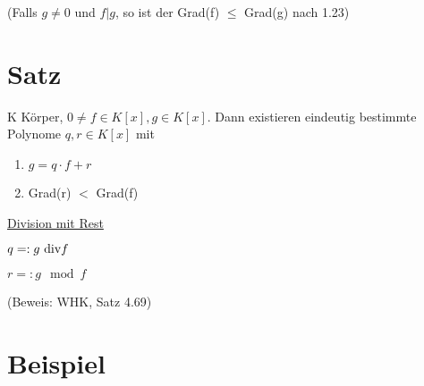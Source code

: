 \documentclass[a4paper, openany]{book}
\begin{document}
    (Falls $g \neq 0$ und $f|g$, so ist der Grad(f) $\le$ Grad(g) nach 1.23)

    \section{Satz}

    K Körper, $0 \neq f \in K[x], g \in K[x]$. Dann existieren eindeutig bestimmte Polynome $q,r \in K[x]$ mit 

    \begin{enumerate}
      \item $g = q \cdot f +r$
      \item Grad(r) $<$ Grad(f)
    \end{enumerate}

    \underline{Division mit Rest}

     $q =: g \textnormal{ div} f$

     $r =: g \mod f$

     (Beweis: WHK, Satz 4.69)

     \section{Beispiel}
\end{document}
